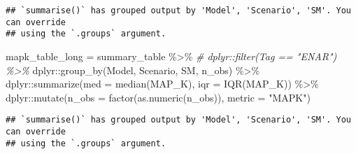 \documentclass[
]{article}
\newenvironment{Shaded}{\begin{snugshade}}{\end{snugshade}}
\newcommand{\AttributeTok}[1]{\textcolor[rgb]{0.77,0.63,0.00}{#1}}
\newcommand{\CommentTok}[1]{\textcolor[rgb]{0.56,0.35,0.01}{\textit{#1}}}
\newcommand{\FunctionTok}[1]{\textcolor[rgb]{0.00,0.00,0.00}{#1}}
\newcommand{\NormalTok}[1]{#1}
\newcommand{\OtherTok}[1]{\textcolor[rgb]{0.56,0.35,0.01}{#1}}
\newcommand{\SpecialCharTok}[1]{\textcolor[rgb]{0.00,0.00,0.00}{#1}}
\newcommand{\StringTok}[1]{\textcolor[rgb]{0.31,0.60,0.02}{#1}}
\begin{document}
\begin{verbatim}
## `summarise()` has grouped output by 'Model', 'Scenario', 'SM'. You can override
## using the `.groups` argument.
\end{verbatim}

\begin{Shaded}
\begin{Highlighting}[]
\NormalTok{mapk\_table\_long }\OtherTok{=}\NormalTok{ summary\_table }\SpecialCharTok{\%\textgreater{}\%} 
  \CommentTok{\# dplyr::filter(Tag == "ENAR") \%\textgreater{}\%}
\NormalTok{  dplyr}\SpecialCharTok{::}\FunctionTok{group\_by}\NormalTok{(Model, Scenario, SM, n\_obs) }\SpecialCharTok{\%\textgreater{}\%}
\NormalTok{  dplyr}\SpecialCharTok{::}\FunctionTok{summarize}\NormalTok{(}\AttributeTok{med =} \FunctionTok{median}\NormalTok{(MAP\_K), }\AttributeTok{iqr =} \FunctionTok{IQR}\NormalTok{(MAP\_K)) }\SpecialCharTok{\%\textgreater{}\%}
\NormalTok{  dplyr}\SpecialCharTok{::}\FunctionTok{mutate}\NormalTok{(}\AttributeTok{n\_obs =} \FunctionTok{factor}\NormalTok{(}\FunctionTok{as.numeric}\NormalTok{(n\_obs)), }\AttributeTok{metric =} \StringTok{"MAPK"}\NormalTok{)}
\end{Highlighting}
\end{Shaded}

\begin{verbatim}
## `summarise()` has grouped output by 'Model', 'Scenario', 'SM'. You can override
## using the `.groups` argument.
\end{verbatim}
\end{document}
